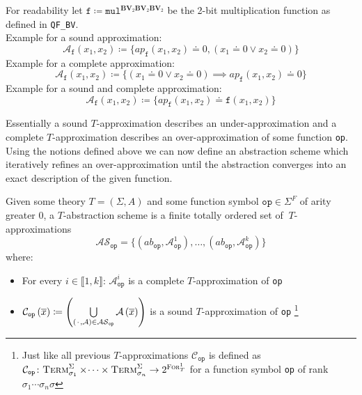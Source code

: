\begin{example}
For readability let $\texttt{f} \coloneqq \texttt{mul}^{\mathbf{BV}_2\mathbf{BV}_2\mathbf{BV}_2}$ be the 2-bit multiplication function as defined in \texttt{QF\_BV}.\\

Example for a sound approximation:
\[
    \mathcal{A}_\texttt{f}\left(x_1,x_2\right) 
    \coloneqq \{
    ap_\texttt{f}\left(x_1,x_2\right) \doteq 0, \left(x_1\doteq 0 \lor x_2 \doteq 0\right)
    \}
\]
Example for a complete approximation:
\[
    \mathcal{A}_\texttt{f}\left(x_1,x_2\right) 
    \coloneqq \{
    \left(x_1\doteq 0 \lor x_2 \doteq 0\right) \implies ap_\texttt{f}\left(x_1,x_2\right) \doteq 0
    \}
\]
Example for a sound and complete approximation:
\[
\mathcal{A}_\texttt{f}\left(x_1,x_2\right) 
        \coloneqq \{
        ap_\texttt{f}\left(x_1,x_2\right) \doteq \texttt{f}\left(x_1,x_2\right)
        \}
\]
\end{example}
Essentially a sound $T$-approximation describes an under-approximation and a complete $T$-approximation describes an over-approximation of some function \texttt{op}. Using the notions defined above we can now define an abstraction scheme which iteratively refines an over-approximation until the abstraction converges into an exact description of the given function.
\begin{definition}
Given some theory $T=\left(\Sigma,A\right)$ and some function symbol $\texttt{op}\in\Sigma^F$ of arity greater $0$, a $T$-abstraction scheme is a finite totally ordered set of $\ T$-approximations \[
\mathcal{AS}_{\texttt{op}} = \{ \left(ab_{\texttt{op}}, \mathcal{A}^1_{\texttt{op}}\right),\dots,\left(ab_{\texttt{op}}, \mathcal{A}^k_{\texttt{op}}\right) \}
\]
where:
\begin{itemize}
    \item For every $i\in\llbracket1,k\rrbracket$: $\mathcal{A}^i_{\texttt{op}}$ is a complete $T$-approximation of \texttt{op}
    \item $\mathcal{C}_{\texttt{op}}\left(\overline{x}\right)\coloneqq\left(\bigcup\limits_{\left({\mkern 2mu\cdot\mkern 2mu},\mathcal{A}\right)\in\mathcal{AS}_{\texttt{op}}} \mathcal{A}\left(\overline{x}\right)\right)$ is a sound $T$-approximation of \texttt{op}
    \footnote{
        Just like all previous $T$-approximations $\mathcal{C}_{\texttt{op}}$ is defined as
        $\mathcal{C}_{\texttt{op}}\colon \textsc{Term}^\Sigma_{\sigma_1}\times\dotsi\times\textsc{Term}^\Sigma_{\sigma_n} \to 2^{\textsc{For}^1_T}$ for a function symbol \texttt{op} of rank $\sigma_1\dotsi\sigma_n\sigma$
    }
\end{itemize}
\end{definition}

